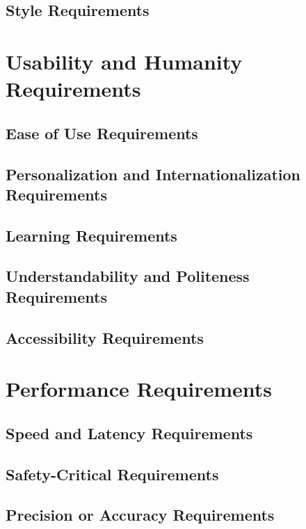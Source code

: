 \documentclass{scrreprt}
\begin{document}
\subsection{Style Requirements}

\section{Usability and Humanity Requirements}

\subsection{Ease of Use Requirements}

\subsection{Personalization and Internationalization Requirements}

\subsection{Learning Requirements}

\subsection{Understandability and Politeness Requirements}

\subsection{Accessibility Requirements}

\section{Performance Requirements}

\subsection{Speed and Latency Requirements}

\subsection{Safety-Critical Requirements}

\subsection{Precision or Accuracy Requirements}
\end{document}
